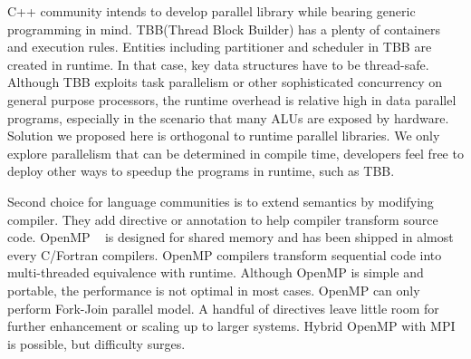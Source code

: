 \documentclass[10pt, conference, compsocconf]{IEEEtran}
\begin{document}
C++ community intends to develop parallel library while bearing generic programming in mind. TBB(Thread Block Builder) has a plenty of containers and execution rules. Entities including partitioner and scheduler in TBB are created in runtime. In that case, key data structures have to be thread-safe. Although TBB exploits task parallelism or other sophisticated concurrency on general purpose processors, the runtime overhead is relative high in data parallel programs, especially in the scenario that many ALUs are exposed by hardware. Solution we proposed here is orthogonal to runtime parallel libraries. We only explore parallelism that can be determined in compile time, developers feel free to deploy other ways to speedup the programs in runtime, such as TBB.
 

Second choice for language communities is to extend semantics by
modifying compiler. They add directive or annotation to help compiler
transform source code. OpenMP ~\cite{openmp} is designed for
shared memory and has been shipped in almost every C/Fortran
compilers. OpenMP compilers transform sequential code into
multi-threaded equivalence with runtime. Although OpenMP is simple and
portable, the performance is not optimal in most cases. OpenMP can
only perform Fork-Join parallel model. A handful of directives leave little room for further enhancement or scaling up to larger systems. Hybrid OpenMP with MPI is possible, but difficulty surges.
\end{document}

